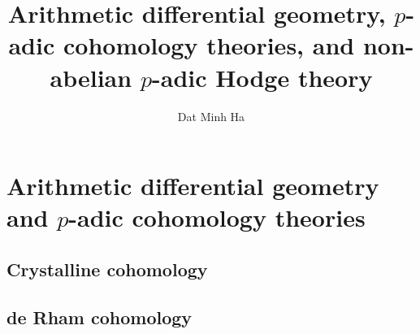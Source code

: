 

\setcounter{section}{-1}





	\title{Arithmetic differential geometry, \texorpdfstring{$p$}{}-adic cohomology theories, and non-abelian \texorpdfstring{$p$}{}-adic Hodge theory}
	
	\author{Dat Minh Ha}
	\maketitle
	
	\begin{abstract}
	    
	\end{abstract}
	
	{
      \hypersetup{} 
      \dominitoc
      \tableofcontents %
    }
    
    \part{Arithmetic differential geometry and \texorpdfstring{$p$}{}-adic cohomology theories}
        \chapter{Crystalline cohomology}
            \begin{abstract}
                
            \end{abstract}
            
            \minitoc
            
            
            
            
            
        \begin{appendices}
            \chapter{de Rham cohomology}
                \begin{abstract}
                    
                \end{abstract}
                
                \minitoc
                
                
                
                
        \end{appendices}
            
